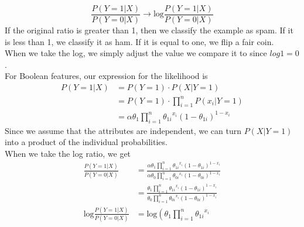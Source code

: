 \documentclass{article}
\begin{document}
\begin{enumerate}
\begin{enumerate}
\begin{equation*}
                    \frac{P(Y=1|X)}{P(Y=0|X)} \rightarrow
                    \text{log}\frac{P(Y=1|X)}{P(Y=0|X)} 
                \end{equation*}
                If the original ratio is greater than 1, then we classify
                the example as spam. If it is less than 1, we classify it 
                as ham. If it is equal to one, we flip a fair coin. \\
                When we take the log, we simply adjust the value we compare
                it to since \(log1=0\). \\
                For Boolean features, our expression for the likelihood is
                \begin{align*}
                    P(Y=1|X)
                        &= P(Y=1) \cdot P(X|Y=1) \\
                        &= P(Y=1) \cdot \prod\limits_{i=1}^n P(x_i|Y=1) \\
                        &= \alpha \theta_1 \prod\limits_{i=1}^n 
                            {\theta_{1i}}^{x_i}(1-\theta_{1i})^{1-x_i}
                \end{align*}
                Since we assume that the attributes are independent, we can
                turn \(P(X|Y=1)\) into a product of the individual
                probabilities. \\
                When we take the log ratio, we get
                \begin{align*}
                    \frac{P(Y=1|X)}{P(Y=0|X)}
                        &= \frac
                            {\alpha \theta_1 
                                \prod\limits_{i=1}^n {\theta_{1i}}^{x_i}
                                (1-\theta_{1i})^{1-x_i}}
                            {\alpha \theta_0
                                \prod\limits_{i=1}^n {\theta_{0i}}^{x_i}
                                (1-\theta_{0i})^{1-x_i}} \\
                        &= \frac
                            {\theta_1 
                                \prod\limits_{i=1}^n {\theta_{1i}}^{x_i}
                                (1-\theta_{1i})^{1-x_i}}
                            {\theta_0
                                \prod\limits_{i=1}^n {\theta_{0i}}^{x_i}
                                (1-\theta_{0i})^{1-x_i}} \\
                    \text{log} \frac{P(Y=1|X)}{P(Y=0|X)}
                        &= \text{log} \left( \theta_1 
                                \prod\limits_{i=1}^n {\theta_{1i}}^{x_i}

\end{align*}
\end{enumerate}
\end{enumerate}
\end{document}
